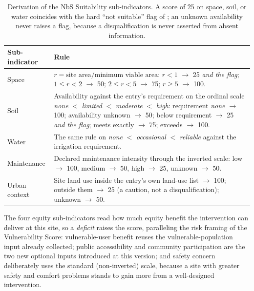 \begin{table}[H]
\centering
\caption[Suitability sub-indicator rules]{Derivation of the NbS Suitability
sub-indicators. A score of 25 on space, soil, or water
coincides with the hard ``not suitable'' flag of ;
an unknown availability never raises a flag, because a disqualification is
never asserted from absent information.}
\label{tab:suitability-rules}
\small
\begin{tabularx}{\textwidth}{@{}l>{\raggedright\arraybackslash}X@{}}
\toprule
\textbf{Sub-indicator} & \textbf{Rule} \\
\midrule
Space &
$r = \text{site area} / \text{minimum viable area}$:
$r < 1$ $\rightarrow$ 25 \emph{and the flag}; $1 \le r < 2$ $\rightarrow$ 50;
$2 \le r < 5$ $\rightarrow$ 75; $r \ge 5$ $\rightarrow$ 100. \\
\addlinespace
Soil &
Availability against the entry's requirement on the ordinal scale
\emph{none} $<$ \emph{limited} $<$ \emph{moderate} $<$ \emph{high}:
requirement \emph{none} $\rightarrow$ 100; availability unknown $\rightarrow$
50; below requirement $\rightarrow$ 25 \emph{and the flag}; meets exactly
$\rightarrow$ 75; exceeds $\rightarrow$ 100. \\
\addlinespace
Water &
The same rule on \emph{none} $<$ \emph{occasional} $<$ \emph{reliable} against
the irrigation requirement. \\
\addlinespace
Maintenance &
Declared maintenance intensity through the inverted scale: low $\rightarrow$
100, medium $\rightarrow$ 50, high $\rightarrow$ 25, unknown $\rightarrow$ 50. \\
\addlinespace
Urban context &
Site land use inside the entry's own land-use list $\rightarrow$ 100;
outside them $\rightarrow$ 25 (a caution, not a disqualification); unknown
$\rightarrow$ 50. \\
\bottomrule
\end{tabularx}
\end{table}

The four equity sub-indicators read how much equity benefit the intervention
can deliver at this site, so a \emph{deficit} raises the score, paralleling the
risk framing of the Vulnerability Score: vulnerable-user benefit reuses the
vulnerable-population input already collected; public accessibility and
community participation are the two new optional inputs introduced at this
version; and safety concern deliberately uses the standard (non-inverted)
scale, because a site with greater safety and comfort problems stands to gain
more from a well-designed intervention.

